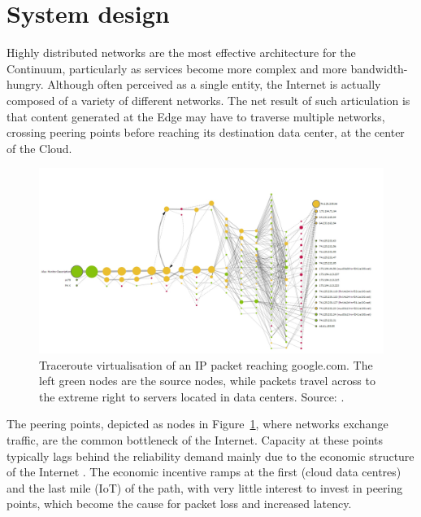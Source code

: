 \section{System design}
\label{sec:technicals}

Highly distributed networks are the most effective architecture for the Continuum, particularly as services become more complex and more bandwidth-hungry. Although often perceived as a single entity, the Internet is actually composed of a variety of different networks. 
The net result of such articulation is that content generated at the Edge may have to traverse multiple networks, crossing peering points before reaching its destination data center, at the center of the Cloud.

\begin{figure}[ht]
\centering
\includegraphics[width=\columnwidth]{figures/traceroute}
\caption{Traceroute virtualisation of an IP packet reaching google.com. The left green nodes are the source nodes, while packets travel across to the extreme right to servers located in data centers. Source: \cite{traceroute-google}.}
\label{fig:traceroute}
\end{figure}

The peering points, depicted as nodes in Figure~\ref{fig:traceroute}, where networks exchange traffic, are the common bottleneck of the Internet. Capacity at these points typically lags behind the reliability demand mainly due to the economic structure of the Internet \cite{nygren2010akamai}. The economic incentive ramps at the first (cloud data centres) and the last mile (IoT) of the path, with very little interest to invest in peering points, which become the cause for packet loss and increased latency.


